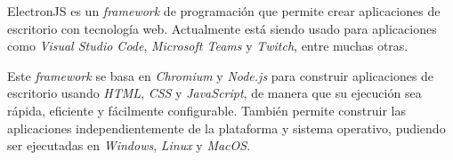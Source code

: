 ElectronJS es un \textit{framework} de programación que permite crear aplicaciones de escritorio con tecnología web. Actualmente está siendo usado para aplicaciones como \textit{Visual Studio Code}, \textit{Microsoft Teams} y \textit{Twitch}, entre muchas otras.

Este \textit{framework} se basa en \textit{Chromium} y \textit{Node.js} para construir aplicaciones de escritorio usando \textit{HTML}, \textit{CSS} y \textit{JavaScript}, de manera que su ejecución sea rápida, eficiente y fácilmente configurable.
También permite construir las aplicaciones independientemente de la plataforma y sistema operativo, pudiendo ser ejecutadas en \textit{Windows}, \textit{Linux} y \textit{MacOS}.

